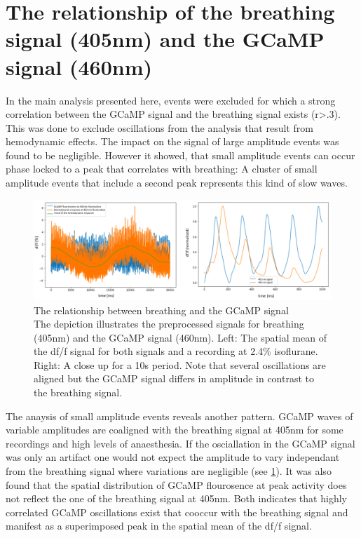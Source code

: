 \section{The relationship of the breathing signal (405nm) and the GCaMP signal (460nm)}
In the main analysis presented here, events were excluded for which a strong correlation between the GCaMP signal and the breathing signal exists (r>.3). This was done to exclude oscillations from the analysis that result from hemodynamic effects. The impact on the signal of large amplitude events was found to be negligible. However it showed, that small amplitude events can occur phase locked to a peak that correlates with breathing: A cluster of small amplitude events that include a second peak represents this kind of slow waves.\\
\begin{figure}[!htb]
\centering
\includegraphics[width=\textwidth,height=\textheight,keepaspectratio]{Figures/hemodynamic_signal}
\decoRule
\caption[The relationship between breathing and the GCaMP signal]{The relationship between breathing and the GCaMP signal\\ The depiction illustrates the preprocessed signals for breathing (405nm) and the GCaMP signal (460nm). Left: The spatial mean of the df/f signal for both signals and a recording at 2.4\% isoflurane. Right: A close up for a 10s period. Note that several oscillations are aligned but the GCaMP signal differs in amplitude in contrast to the breathing signal.}
\label{fig:hemodynamic_signal}
\end{figure}
The anaysis of small amplitude events reveals another pattern. GCaMP waves of variable amplitudes are coaligned with the breathing signal at 405nm for some recordings and high levels of anaesthesia. If the osciallation in the GCaMP signal was only an artifact one would not expect the amplitude to vary independant from the breathing signal where variations are negligible (see \ref{fig:hemodynamic_signal}). It was also found that the spatial distribution of GCaMP flourosence at peak activity does not reflect the one of the breathing signal at 405nm. Both indicates that highly correlated GCaMP oscillations exist that cooccur with the breathing signal and manifest as a superimposed peak in the spatial mean of the df/f signal.\\
